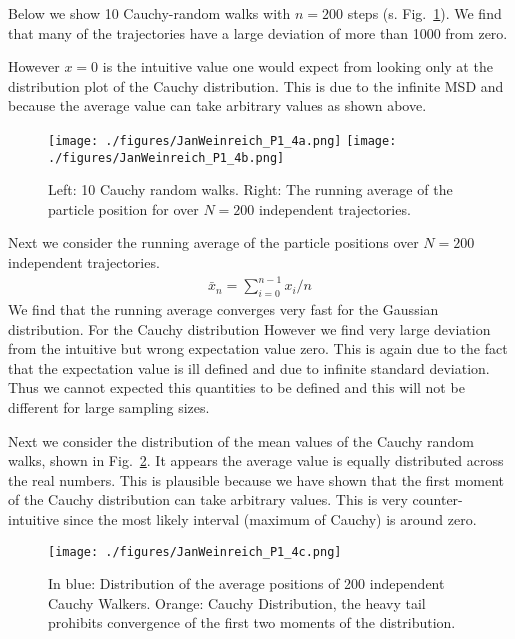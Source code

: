 \documentclass[12pt]{article}
\begin{document}
Below we show 10 Cauchy-random walks with $n=200$ steps (s. Fig.~\ref{fig:abb6}). We find that many
of the trajectories have a large deviation of more than 1000 from zero.
 
However $x=0$ is the intuitive value one would expect from looking only at the distribution plot of the Cauchy distribution.
This is due to the infinite MSD and because the average value can take arbitrary values as shown above.
 
 
 
\begin{figure}[H]
  \centering
    \texttt{[image: ./figures/JanWeinreich\_P1\_4a.png]}
    \texttt{[image: ./figures/JanWeinreich\_P1\_4b.png]}
    \caption{Left: 10 Cauchy random walks. Right: The running average of the particle position for
    over $N=200$ independent trajectories.}
    \label{fig:abb6}
  \end{figure}
 
  Next we consider the running average of the particle positions over $N=200$ independent trajectories.
  \begin{align}
    \bar{x}_{n} = \sum_{i=0}^{n-1} x_{i}/n
  \end{align}
  We find that the running average converges very fast for the Gaussian distribution. For the 
  Cauchy distribution However we find very large deviation from the intuitive but wrong 
  expectation value zero. This is again due to the fact that the expectation value is ill defined
  and due to infinite standard deviation. Thus we cannot expected this quantities to be defined and
  this will not be different for large sampling sizes.
 
 
 
  Next we consider the distribution of the mean values of the 
  Cauchy random walks, shown in Fig.~\ref{fig:abb7}.
  It appears the average value is equally distributed across the real numbers.
  This is plausible because we have shown that the first moment of
  the Cauchy distribution can take arbitrary values.
  This is very counter-intuitive since the most likely interval (maximum of Cauchy) is around zero.
  \begin{figure}[H]
    \centering
      \texttt{[image: ./figures/JanWeinreich\_P1\_4c.png]}
      \caption{In blue: Distribution of the average positions of 200 independent
      Cauchy Walkers. Orange: Cauchy Distribution, the heavy tail prohibits convergence of the first two moments of the distribution.}
      \label{fig:abb7}
    \end{figure}
 
\end{document}
